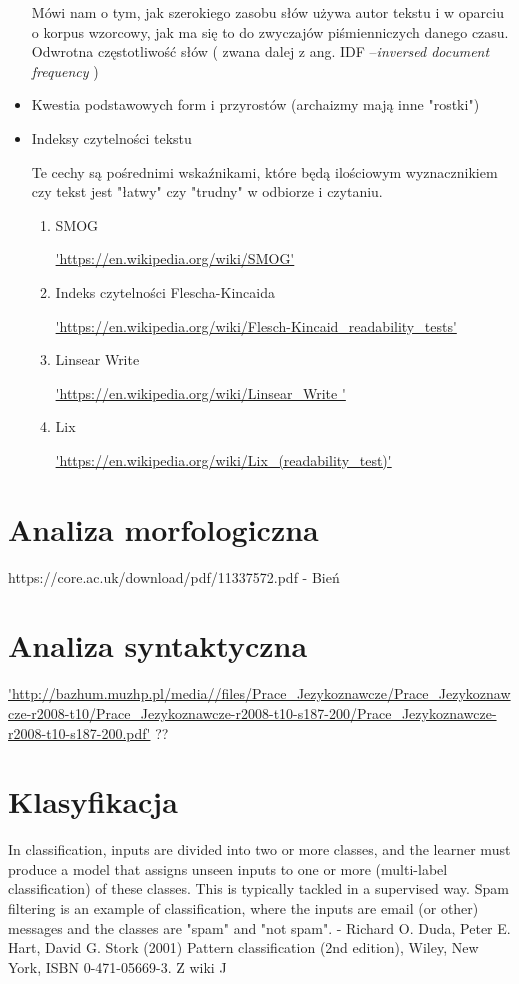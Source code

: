 \documentclass[a4paper,12pt,twoside,openany]{report}
\begin{document}
\begin{itemize}
Mówi nam o tym, jak szerokiego zasobu słów używa autor tekstu i w oparciu o korpus wzorcowy, jak ma się to do zwyczajów piśmienniczych danego czasu.
Odwrotna częstotliwość słów ( zwana dalej z ang. IDF --\textit{inversed document frequency }) 
\item Kwestia podstawowych form i przyrostów (archaizmy mają inne "rostki")
\item Indeksy czytelności tekstu

Te cechy są pośrednimi wskaźnikami, które będą ilościowym wyznacznikiem czy tekst jest "łatwy" czy "trudny" w odbiorze i czytaniu. 
	\begin{enumerate}
	\item SMOG
	
	\url{'https://en.wikipedia.org/wiki/SMOG'}
	\item Indeks czytelności Flescha-Kincaida
	
	\url{'https://en.wikipedia.org/wiki/Flesch-Kincaid_readability_tests'}
	\item Linsear Write
	
	\url{'https://en.wikipedia.org/wiki/Linsear_Write	'}
	\item Lix
	
	\url{'https://en.wikipedia.org/wiki/Lix_(readability_test)'}
	\end{enumerate}
\end{itemize} 	
	
	
\section{Analiza morfologiczna}
https://core.ac.uk/download/pdf/11337572.pdf - Bień
\section{Analiza syntaktyczna}
\url{'http://bazhum.muzhp.pl/media//files/Prace_Jezykoznawcze/Prace_Jezykoznawcze-r2008-t10/Prace_Jezykoznawcze-r2008-t10-s187-200/Prace_Jezykoznawcze-r2008-t10-s187-200.pdf'} ??
\section{Klasyfikacja}
In classification, inputs are divided into two or more classes, and the learner must produce a model that assigns unseen inputs to one or more (multi-label classification) of these classes. This is typically tackled in a supervised way. Spam filtering is an example of classification, where the inputs are email (or other) messages and the classes are "spam" and "not spam". - Richard O. Duda, Peter E. Hart, David G. Stork (2001) Pattern classification (2nd edition), Wiley, New York, ISBN 0-471-05669-3. Z wiki ^^
\end{document}

